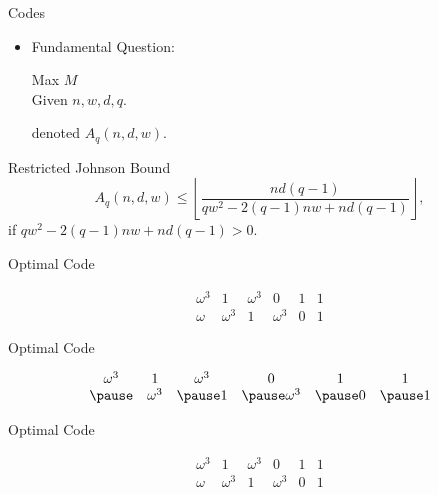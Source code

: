 \documentclass{beamer}
\newcommand{\M}{A}
\begin{document}
 
 \begin{frame}{Codes}
 
  \begin{itemize}
   \item Fundamental Question:
   \begin{center}
    Max $M$ \\
    Given $n,w,d,q$.
   \end{center}
   denoted $\M_q(n,d,w)$.
  \end{itemize}
  
  \pause
  \begin{block}{Restricted Johnson Bound}
 \begin{equation}\label{eq1}
  \M_q(n,d,w) \leq \left\lfloor \frac{nd(q-1)}{qw^2-2(q-1)nw+nd(q-1)} \right\rfloor,
 \end{equation}
 if $qw^2-2(q-1)nw+nd(q-1)>0$.
 \end{block}
  
 \end{frame}
 
 
 \begin{frame}{Optimal Code}
  
  \[
   \begin{array}{cccccc}
    \omega^3&1&\omega^3&0&1&1\\
    \omega&\omega^3&1&\omega^3&0&1
   \end{array}
  \]

 \end{frame}
 
 
 \begin{frame}{Optimal Code}
  
  \[
   \begin{array}{cccccc}
    \omega^3&1&\omega^3&0&1&1\\ \pause
    &\omega^3&\pause1&\pause\omega^3&\pause0&\pause1
   \end{array}
  \]

 \end{frame}
 
 
 \begin{frame}{Optimal Code}
  
  \[
   \begin{array}{cccccc}
    \omega^3&1&\omega^3&0&1&1\\
    \omega&\omega^3&1&\omega^3&0&1
   \end{array}
  \]

 \end{frame}
\end{document}
